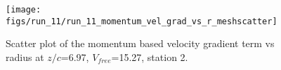 \begin{figure}[H]
\centering
\texttt{[image: figs/run\_11/run\_11\_momentum\_vel\_grad\_vs\_r\_meshscatter]}
\caption{Scatter plot of the momentum based velocity gradient term vs radius at $z/c$=6.97, $V_{free}$=15.27, station 2.}
\label{fig:run_11_momentum_vel_grad_vs_r_meshscatter}
\end{figure}


